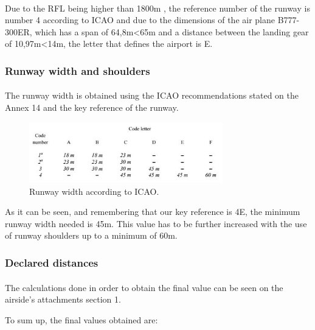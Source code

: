 			\paragraph{}Due to the RFL being higher than 1800m , the reference number of the runway is number 4 according to ICAO and due to the dimensions of the air plane B777-300ER, which has a span of 64,8m<65m and a distance between the landing gear of 10,97m<14m, the letter that defines the airport is E.
			
			\subsubsection{Runway width and shoulders}
			\paragraph{}The runway width is obtained using the ICAO recommendations stated on the Annex 14 and the key reference of the runway. 
			
			\begin{figure}[H]
				\centering
				\includegraphics[clip, trim=0cm 0cm 0cm 0cm, width=0.75\textwidth]{./images/Annex14/RunwayWidth}
				\caption{Runway width according to ICAO.} %
				\label{} %
			\end{figure}
		
			As it can be seen, and remembering that our key reference is 4E, the minimum runway width needed is 45m. This value has to be further increased with the use of runway shoulders up to a minimum of 60m. 

			\subsubsection{Declared distances}
			\paragraph{} The calculations done in order to obtain the final value can be seen on the airside’s attachments section 1. 
			
			To sum up, the final values obtained are:
			
